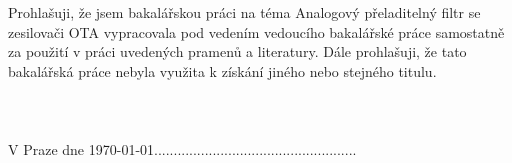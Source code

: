 \vspace{18cm}

Prohlašuji, že jsem bakalářskou práci na téma Analogový  přeladitelný filtr se zesilovači OTA vypracovala pod vedením vedoucího bakalářské práce samostatně za použití v práci uvedených pramenů a literatury. Dále prohlašuji, že tato bakalářská práce nebyla využita k získání jiného nebo stejného titulu.\\
\\
\\
\\
V Praze dne \today \hfill \hfill ....................................................

